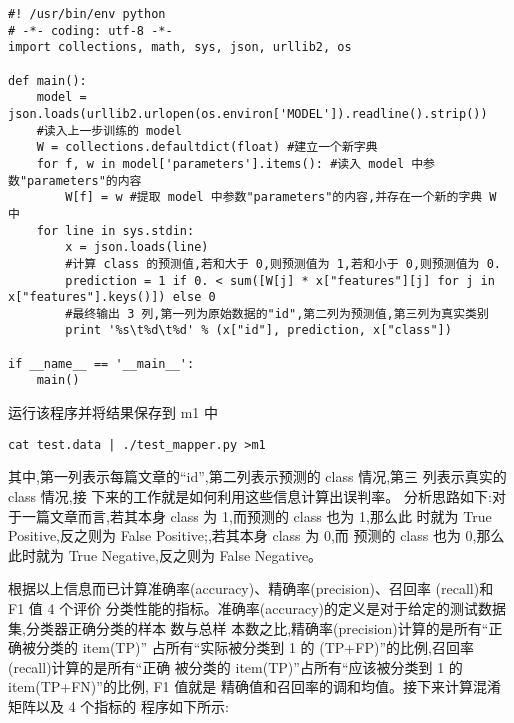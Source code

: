 \begin{lstlisting}
#! /usr/bin/env python
# -*- coding: utf-8 -*-
import collections, math, sys, json, urllib2, os

def main():
    model = json.loads(urllib2.urlopen(os.environ['MODEL']).readline().strip())
    #读入上一步训练的 model
    W = collections.defaultdict(float) #建立一个新字典
    for f, w in model['parameters'].items(): #读入 model 中参数"parameters"的内容
        W[f] = w #提取 model 中参数"parameters"的内容,并存在一个新的字典 W 中
    for line in sys.stdin:
        x = json.loads(line)
        #计算 class 的预测值,若和大于 0,则预测值为 1,若和小于 0,则预测值为 0.
        prediction = 1 if 0. < sum([W[j] * x["features"][j] for j in x["features"].keys()]) else 0
        #最终输出 3 列,第一列为原始数据的"id",第二列为预测值,第三列为真实类别
        print '%s\t%d\t%d' % (x["id"], prediction, x["class"])

if __name__ == '__main__':
    main()
\end{lstlisting}

运行该程序并将结果保存到 m1 中

\begin{lstlisting}
cat test.data | ./test_mapper.py >m1
\end{lstlisting}

其中,第一列表示每篇文章的``id'',第二列表示预测的 class 情况,第三
列表示真实的 class 情况,接 下来的工作就是如何利用这些信息计算出误判率。
分析思路如下:对于一篇文章而言,若其本身 class 为 1,而预测的 class 也为
1,那么此 时就为 True Positive,反之则为 False Positive;,若其本身 class 为
0,而 预测的 class 也为 0,那么此时就为 True Negative,反之则为 False
Negative。

根据以上信息而已计算准确率(accuracy)、精确率(precision)、召回率
(recall)和 F1 值 4 个评价
分类性能的指标。准确率(accuracy)的定义是对于给定的测试数据集,分类器正确分类的样本
数与总样 本数之比,精确率(precision)计算的是所有``正确被分类的 item(TP)''
占所有``实际被分类到 1 的
(TP+FP)''的比例,召回率(recall)计算的是所有``正确 被分类的
item(TP)''占所有``应该被分类到 1 的 item(TP+FN)''的比例, F1 值就是
精确值和召回率的调和均值。接下来计算混淆矩阵以及 4 个指标的
程序如下所示:

